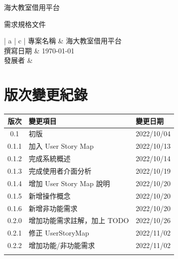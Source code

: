 \documentclass{article}
\begin{document}
\begin{titlepage}
	\centering

	{\huge 海大教室借用平台}

	\vfill

	{\huge 需求規格文件}

	\vfill

	\begin{Large}
		\begin{center}
			\begin{tabular}{| a | c |}
				\hline
				專案名稱 & 海大教室借用平台               \\ \hline
				撰寫日期 & \today                 \\ \hline
				發展者  &  \\ \hline
			\end{tabular}
		\end{center}
	\end{Large}
\end{titlepage}


\section*{版次變更紀錄}

\begin{tabularx}{\textwidth}{| c | X | X |}
	\rowcolor{LightGray}
	\hline
	版次    & 變更項目                 & 變更日期       \\ \hline
	0.1   & 初版                   & 2022/10/04 \\ \hline
	0.1.1 & 加入 User Story Map    & 2022/10/13 \\ \hline
	0.1.2 & 完成系統概述               & 2022/10/14 \\ \hline
	0.1.3 & 完成使用者介面分析            & 2022/10/19 \\ \hline
	0.1.4 & 增加 User Story Map 說明 & 2022/10/20 \\ \hline
	0.1.5 & 新增操作概念               & 2022/10/20 \\ \hline
	0.1.6 & 新增非功能需求              & 2022/10/20 \\ \hline
	0.2.0 & 增加功能需求註解，加上 TODO     & 2022/10/26 \\ \hline
	0.2.1 & 修正 UserStoryMap      & 2022/11/02 \\ \hline
	0.2.2 & 增加功能/非功能需求           & 2022/11/02 \\ \hline
	      &                      &            \\ \hline
\end{tabularx}
\end{document}
